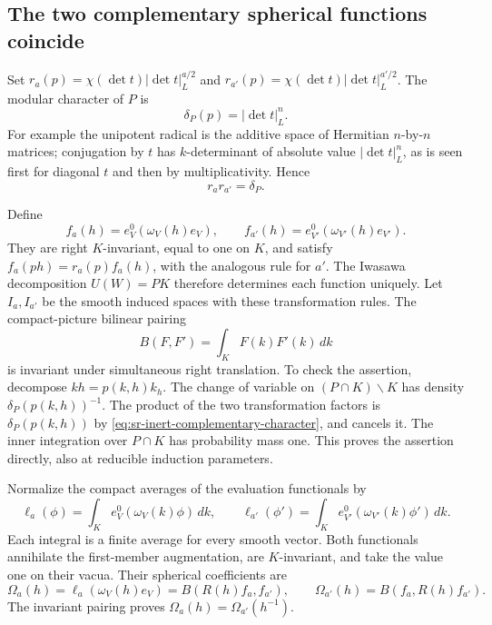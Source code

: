 \subsection{The two complementary spherical functions coincide}
Set \(r_a(p)=\chi(\det t)|\det t|_L^{a/2}\) and
\(r_{a'}(p)=\chi(\det t)|\det t|_L^{a'/2}\).
The modular character of \(P\) is
\[
                   \delta_P(p)=|\det t|_L^n.
\]
For example the unipotent radical is the additive space of
Hermitian \(n\)-by-\(n\) matrices; conjugation by \(t\)
has \(k\)-determinant of absolute value
\(|\det t|_L^n\), as is seen first for diagonal \(t\)
and then by multiplicativity. Hence
\begin{equation}\label{eq:sr-inert-complementary-character}
                          r_a r_{a'}=\delta_P.
\end{equation}

Define
\[
 f_a(h)=e_V^0(\omega_V(h)e_V),\qquad
 f_{a'}(h)=e_{V'}^0(\omega_{V'}(h)e_{V'}).
\]
They are right \(K\)-invariant, equal to one on \(K\), and
satisfy \(f_a(ph)=r_a(p)f_a(h)\), with the analogous rule
for \(a'\). The Iwasawa decomposition \(U(W)=PK\)
therefore determines each function uniquely.
Let \(I_a,I_{a'}\) be the smooth induced spaces with these
transformation rules. The compact-picture bilinear pairing
\[
                    B(F,F')=\int_K F(k)F'(k)\,dk
\]
is invariant under simultaneous right translation.
To check the assertion, decompose \(kh=p(k,h)k_h\).
The change of variable on \((P\cap K)\backslash K\)
has density \(\delta_P(p(k,h))^{-1}\).
The product of the two transformation factors is
\(\delta_P(p(k,h))\) by
\eqref{eq:sr-inert-complementary-character}, and cancels it.
The inner integration over \(P\cap K\) has probability mass one.
This proves the assertion directly, also at reducible induction
parameters.

Normalize the compact averages of the evaluation functionals by
\[
 \ell_a(\phi)=\int_K e_V^0(\omega_V(k)\phi)\,dk,\qquad
 \ell_{a'}(\phi')=\int_K e_{V'}^0(\omega_{V'}(k)\phi')\,dk.
\]
Each integral is a finite average for every smooth vector.
Both functionals annihilate the first-member augmentation,
are \(K\)-invariant, and take the value one on their vacua.
Their spherical coefficients are
\[
 \Omega_a(h)=\ell_a(\omega_V(h)e_V)
              =B(R(h)f_a,f_{a'}),\qquad
 \Omega_{a'}(h)=B(f_a,R(h)f_{a'}).
\]
The invariant pairing proves
\(\Omega_a(h)=\Omega_{a'}(h^{-1})\).

